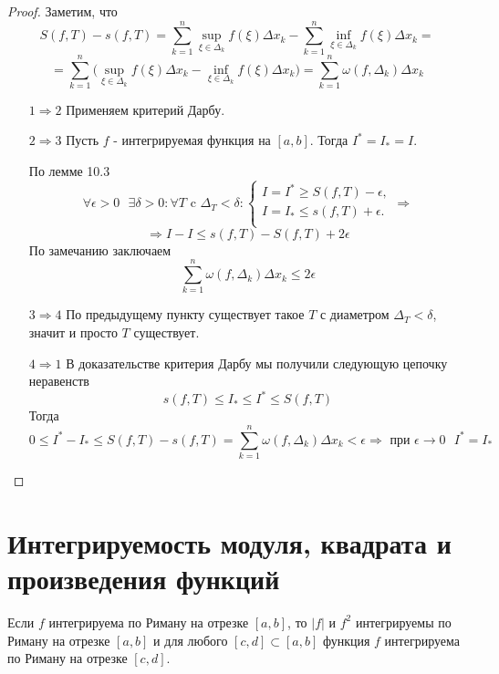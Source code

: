     \begin{proof}
    	Заметим, что
    	\[ S(f, T) - s(f, T) = \sum_{k = 1}^n \sup_{\xi \in \Delta_k} f(\xi) \Delta x_k - \sum_{k = 1}^n \inf_{\xi \in \Delta_k} f(\xi) \Delta x_k = \]
    	\[ = \sum_{k = 1}^n \bigg(\sup_{\xi \in \Delta_k} f(\xi) \Delta x_k - \inf_{\xi \in \Delta_k} f(\xi) \Delta x_k\bigg) = \sum_{k = 1}^n \omega(f, \Delta_k) \Delta x_k \]
    	
    	\begin{enumerate}
    		\item[$1 \Rightarrow 2$] Применяем критерий Дарбу.
    		\item[$2 \Rightarrow 3$] Пусть $f$ - интегрируемая функция на $[a, b]$. Тогда $I^{*} = I_{*} = I$.
    		
    		По лемме 10.3
    		\[ \forall \epsilon > 0 \text{ } \exists \delta > 0: \forall T \text{ c } \Delta_T < \delta:
    		\displaystyle \left\{{
    			\begin{matrix}
    				I = I^{*} \geqslant S(f, T) - \epsilon, \\
    				I = I_{*} \leqslant s(f, T) + \epsilon. \\
    			\end{matrix}
    		}\right. \Rightarrow \]
    		\[ \Rightarrow I - I \leqslant s(f, T) - S(f, T) + 2\epsilon \]
    		По замечанию заключаем
    		\[ \sum_{k = 1}^n \omega(f, \Delta_k) \Delta x_k \leqslant 2\epsilon \]
    		\item[$3 \Rightarrow 4$] По предыдущему пункту существует такое $T$ с диаметром $\Delta_T < \delta$, значит и просто $T$ существует.
    		\item[$4 \Rightarrow 1$] В доказательстве критерия Дарбу мы получили следующую цепочку неравенств
    	    \[ s(f, T) \leqslant I_{*} \leqslant I^{*} \leqslant S(f, T) \]
    	    Тогда
    	    \[ 0 \leqslant I^{*} - I_{*} \leqslant S(f, T) - s(f, T) = \sum_{k = 1}^n \omega(f, \Delta_k) \Delta x_k < \epsilon \Rightarrow \text{ при } \epsilon \to 0 \text{ } I^{*} = I_{*} \]
    	\end{enumerate}
    \end{proof}
    
     \section{Интегрируемость модуля, квадрата и произведения функций}
    
    \begin{corollary}
    	Если $f$ интегрируема по Риману на отрезке $[a, b]$, то $|f|$ и $f^2$ интегрируемы по Риману на отрезке $[a, b]$ и для любого $[c, d] \subset [a, b]$ функция $f$ интегрируема по Риману на отрезке
    	$[c, d]$.
    \end{corollary}
    
